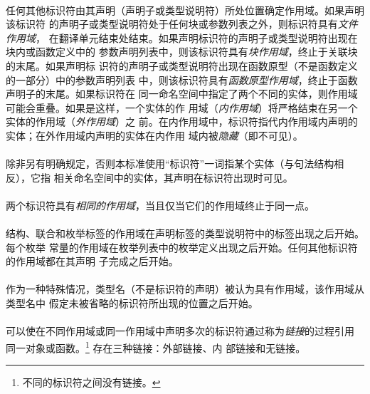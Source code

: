 {\paragraph{}
任何其他标识符由其声明（声明子或类型说明符）所处位置确定作用域。如果声明该标识符
的声明子或类型说明符处于任何块或参数列表之外，则标识符具有\textit{文件作用域}，
在翻译单元结束处结束。如果声明标识符的声明子或类型说明符出现在块内或函数定义中的
参数声明列表中，则该标识符具有\textit{块作用域}，终止于关联块的末尾。如果声明标
识符的声明子或类型说明符出现在函数原型（不是函数定义的一部分）中的参数声明列表
中，则该标识符具有\textit{函数原型作用域}，终止于函数声明子的末尾。如果标识符在
同一命名空间中指定了两个不同的实体，则作用域可能会重叠。如果是这样，一个实体的作
用域（\textit{内作用域}）将严格结束在另一个实体的作用域（\textit{外作用域}）之
前。在内作用域中，标识符指代内作用域内声明的实体；在外作用域内声明的实体在内作用
域内被\textit{隐藏}（即不可见）。

\paragraph{}
除非另有明确规定，否则本标准使用``标识符''一词指某个实体（与句法结构相反），它指
相关命名空间中的实体，其声明在标识符出现时可见。

\paragraph{}
两个标识符具有\textit{相同的作用域}，当且仅当它们的作用域终止于同一点。

\paragraph{}
结构、联合和枚举标签的作用域在声明标签的类型说明符中的标签出现之后开始。每个枚举
常量的作用域在枚举列表中的枚举定义出现之后开始。任何其他标识符的作用域都在其声明
子完成之后开始。

\paragraph{}
作为一种特殊情况，类型名（不是标识符的声明）被认为具有作用域，该作用域从类型名中
假定未被省略的标识符所出现的位置之后开始。


\paragraph{}
可以使在不同作用域或同一作用域中声明多次的标识符通过称为\textit{链接}的过程引用
同一对象或函数。\footnote{不同的标识符之间没有链接。} 存在三种链接：外部链接、内
部链接和无链接。

}
